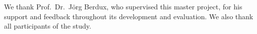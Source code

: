 
We thank Prof.\ Dr.\ Jörg Berdux, who supervised this master project, for his support and feedback throughout its development and evaluation. We also thank all participants of the study.
